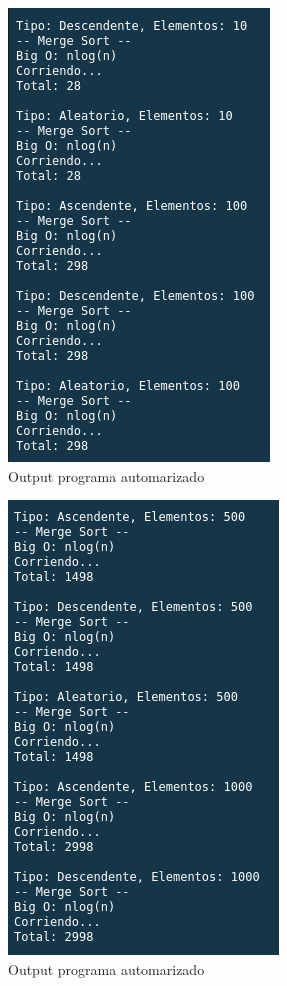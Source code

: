 \documentclass{article}
\begin{document}
		\begin{figure}[H]
			\centering
			\includegraphics[scale = 1]{images/e48.png}
			\caption{Output programa automarizado}
		\end{figure}
	
		\begin{figure}[H]
			\centering
			\includegraphics[scale = 1]{images/e49.png}
			\caption{Output programa automarizado}
		\end{figure}
		
\end{document}
